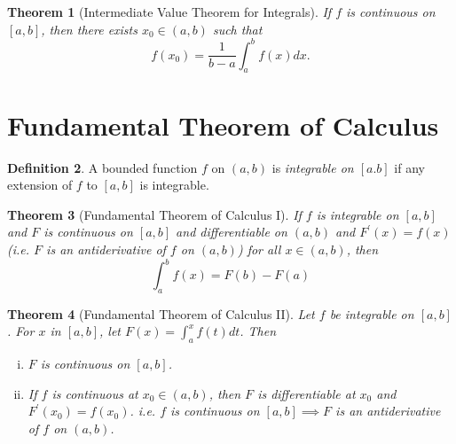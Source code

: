 \documentclass[12pt, lettersize]{book}
\theoremstyle{plain}
\newtheorem{thm}{Theorem}[section]
\theoremstyle{definition}
\newtheorem{dfn}[thm]{Definition}
\theoremstyle{remark}
\begin{document}
			\begin{thm}[Intermediate Value Theorem for Integrals]
			If $f$ is continuous on $[a,b]$, then there exists $x_0\in(a,b)$ such that
			\begin{displaymath}
				f(x_0)=\frac{1}{b-a}\int_{a}^{b}f(x)dx.
			\end{displaymath}
			\end{thm}
			\newpage
		\section{Fundamental Theorem of Calculus}
			\begin{dfn}
			A bounded function $f$ on $(a,b)$ is \emph{integrable on $[a.b]$} if any extension of $f$ to $[a,b]$ is integrable.
			\end{dfn}
			
			\begin{thm}[Fundamental Theorem of Calculus I]
			If $f$ is integrable on $[a,b]$ and $F$ is continuous on $[a,b]$ and differentiable on $(a,b)$ and $F^\prime(x)=f(x)$ (i.e. $F$ is an antiderivative of $f$ on $(a,b)$) for all $x\in(a,b)$, then
			\begin{displaymath}
				\int_{a}^{b}f(x)=F(b)-F(a)
			\end{displaymath}
			\end{thm}
			
			\begin{thm}[Fundamental Theorem of Calculus II]
			Let $f$ be integrable on $[a,b]$. For $x$ in $[a,b]$, let $F(x)=\int_{a}^{x}f(t)dt$. Then
			\begin{enumerate}[(i)]
				\item $F$ is continuous on $[a,b]$.
				\item If $f$ is continuous at $x_0\in(a,b)$, then $F$ is differentiable at $x_0$ and $F^\prime(x_0)=f(x_0)$. i.e. $f$ is continuous on $[a,b]\implies F$ is an antiderivative of $f$ on $(a,b)$. 
			\end{enumerate}
			\end{thm}
\end{document}
